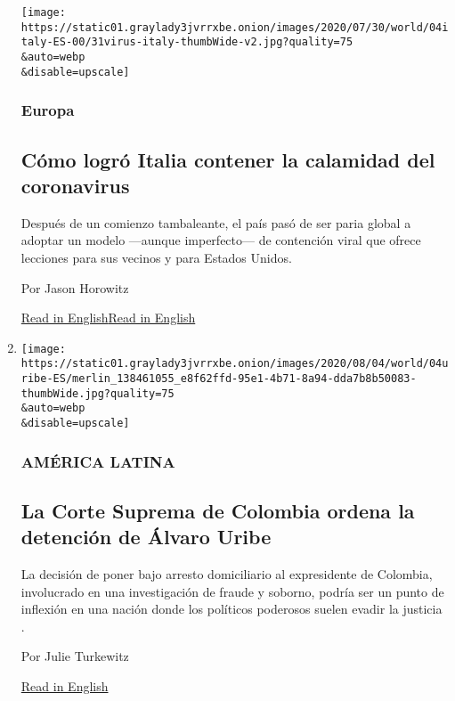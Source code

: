 \begin{enumerate}
  \texttt{[image: https://static01.graylady3jvrrxbe.onion/images/2020/07/30/world/04italy-ES-00/31virus-italy-thumbWide-v2.jpg?quality=75\\\&auto=webp\\\&disable=upscale]}

  \hypertarget{europa}{%
  \subsubsection{Europa}\label{europa}}

  \hypertarget{cuxf3mo-logruxf3-italia-contener-la-calamidad-del-coronavirus}{%
  \subsection{Cómo logró Italia contener la calamidad del
  coronavirus}\label{cuxf3mo-logruxf3-italia-contener-la-calamidad-del-coronavirus}}

  Después de un comienzo tambaleante, el país pasó de ser paria global a
  adoptar un modelo ---aunque imperfecto--- de contención viral que
  ofrece lecciones para sus vecinos y para Estados Unidos.

  Por Jason Horowitz

  \href{https://www.nytimes3xbfgragh.onion/2020/07/31/world/europe/italy-coronavirus-reopening.html}{Read
  in
  English}\href{https://www.nytimes3xbfgragh.onion/2020/07/31/world/europe/italy-coronavirus-reopening.html}{Read
  in English}
\item
  \href{/es/2020/08/04/espanol/america-latina/alvaro-uribe-detencion-colombia.html}{}

  \texttt{[image: https://static01.graylady3jvrrxbe.onion/images/2020/08/04/world/04uribe-ES/merlin\_138461055\_e8f62ffd-95e1-4b71-8a94-dda7b8b50083-thumbWide.jpg?quality=75\\\&auto=webp\\\&disable=upscale]}

  \hypertarget{amuxe9rica-latina-1}{%
  \subsubsection{AMÉRICA LATINA}\label{amuxe9rica-latina-1}}

  \hypertarget{la-corte-suprema-de-colombia-ordena-la-detenciuxf3n-de-uxe1lvaro-uribe}{%
  \subsection{La Corte Suprema de Colombia ordena la detención de Álvaro
  Uribe}\label{la-corte-suprema-de-colombia-ordena-la-detenciuxf3n-de-uxe1lvaro-uribe}}

  La decisión de poner bajo arresto domiciliario al expresidente de
  Colombia, involucrado en una investigación de fraude y soborno, podría
  ser un punto de inflexión en una nación donde los políticos poderosos
  suelen evadir la justicia .

  Por Julie Turkewitz

  \href{https://www.nytimes3xbfgragh.onion/2020/08/04/world/americas/colombia-president-uribe-charged.html}{Read
  in English}
\end{enumerate}

